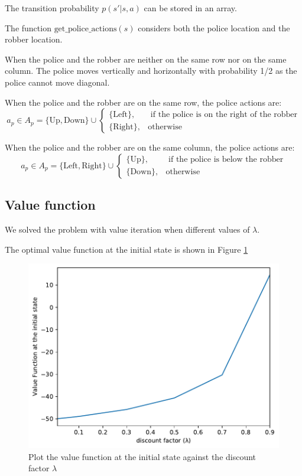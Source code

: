 \documentclass{article}
\begin{document}
The transition probability $p(s' | s, a)$ can be stored in an array.

The function $\text{get\_police\_actions}(s)$ considers both the police location
and the robber location.

When the police and the robber are neither on the same row nor on the same column.
The police moves vertically and horizontally with probability 1/2 as the police
cannot move diagonal.

When the police and the robber are on the same row, the police actions are:
\begin{equation*}
  a_p \in A_p = \{ \text{Up}, \text{Down} \} \cup
  \begin{cases}
    \{ \text{Left} \}, & \text{ if the police is on the right of the robber}\\
    \{ \text{Right} \},& \text{otherwise}
  \end{cases}
\end{equation*}

When the police and the robber are on the same column, the police actions are:
\begin{equation*}
  a_p \in A_p =\{ \text{Left}, \text{Right} \} \cup
  \begin{cases}
    \{ \text{Up} \}, & \text{ if the police is below the robber}\\
    \{ \text{Down} \},& \text{otherwise}
  \end{cases}
\end{equation*}

\subsection{Value function}
We solved the problem with value iteration when different values of $\lambda$.

The optimal value function at the initial state is shown in Figure \ref{fig:prob2-valfun}

\begin{figure}
  \centering
  \includegraphics[width=.9\linewidth]{prob2_vfunc.pdf}
  \caption{Plot the value function at the initial state against the discount factor $\lambda$}
  \label{fig:prob2-valfun}
\end{figure}
\end{document}
